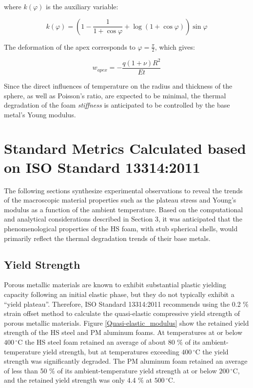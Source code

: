 \documentclass[review]{elsarticle}
\begin{document}
{where $k(\varphi)$ is the auxiliary variable:

\begin{equation}\label{Eq7}
k(\varphi)=\left ( 1- \frac{1}{1+\cos\varphi} + \log(1+\cos\varphi) \right ) \sin \varphi
\end{equation}

The deformation of the apex corresponds to $\varphi=\frac{\pi}{2}$, which gives:

\begin{equation}\label{Eq8}
w_{apex}=-\frac{q(1+\nu)R^2}{Et}
\end{equation}

Since the direct influences of temperature on the radius and thickness of the sphere, as well as Poisson’s ratio, are expected to be minimal, the thermal degradation of the foam \emph{stiffness} is anticipated to be controlled by the base metal’s Young modulus.

\section{Standard Metrics Calculated based on ISO Standard 13314:2011}

The following sections synthesize experimental observations to reveal the trends of the macroscopic material properties such as the plateau stress and Young’s modulus as a function of the ambient temperature. Based on the computational and analytical considerations described in Section 3, it was anticipated that the phenomenological properties of the HS foam, with stub spherical shells, would primarily reflect the thermal degradation trends of their base metals.

\subsection{Yield Strength}

Porous metallic materials are known to exhibit substantial plastic yielding capacity following an initial elastic phase, but they do not typically exhibit a “yield plateau”. Therefore, ISO Standard 13314:2011 recommends using the 0.2 \% strain offset method to calculate the quasi-elastic compressive yield strength of porous metallic materials. Figure \ref{Quasi-elastic_modulus} show the retained yield strength of the HS steel and PM aluminum foams. At temperatures at or below $400\,^{\circ}\mathrm{C}$ the HS steel foam retained an average of about 80 \% of its ambient-temperature yield strength, but at temperatures exceeding $400\,^{\circ}\mathrm{C}$ the yield strength was significantly degraded. The PM aluminum foam retained an average of less than 50 \% of its ambient-temperature yield strength at or below $200\,^{\circ}\mathrm{C}$, and the retained yield strength was only 4.4 \% at $500\,^{\circ}\mathrm{C}$. 

}
\end{document}
